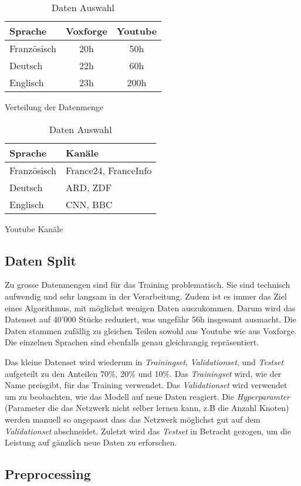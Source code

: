 \begin{table}[h]
    \begin{subtable}[t ]{0.45\textwidth}
        \centering
        \begin{tabular}[t]{l || c c}
        Sprache & Voxforge & Youtube \\
        \hline \hline
        Französisch & 20h & 50h\\
        Deutsch & 22h & 60h\\
        Englisch & 23h & 200h\\
        \end{tabular}
        \caption{Verteilung der Datenmenge}
        \label{tab:amount}
    \end{subtable}
    \hfill
    \begin{subtable}[t ]{0.45\textwidth}
        \centering
        \begin{tabular}[t]{l || l}
        Sprache & Kanäle \\
        \hline \hline
        Französisch & France24, FranceInfo\\
        Deutsch & ARD, ZDF\\
        Englisch & CNN,  BBC
        \end{tabular}
        \caption{Youtube Kanäle}
        \label{tab:channels}
    \end{subtable}
    \caption{Daten Auswahl}
    \label{tab:data}
\end{table}


\subsection{Daten Split}
Zu grosse Datenmengen sind für das Training problematisch. Sie sind technisch aufwendig und sehr langsam in der Verarbeitung. Zudem ist es immer das Ziel eines Algorithmus, mit möglichst wenigen Daten auszukommen. Darum wird das Datenset auf 40'000 Stücke reduziert, was ungefähr 56h insgesamt ausmacht. Die Daten stammen zufällig zu gleichen Teilen sowohl aus Youtube wie aus Voxforge. Die einzelnen Sprachen sind ebenfalls genau gleichrangig repräsentiert.

Das kleine Datenset wird wiederum in \textit{Trainingset}, \textit{Validationset}, und \textit{Testset} aufgeteilt zu den Anteilen 70\%, 20\% und 10\%. Das \textit{Trainingset} wird, wie der Name preisgibt, für das Training verwendet. Das \textit{Validationset} wird verwendet um zu beobachten, wie das Modell auf neue Daten reagiert. Die \textit{Hyperparamter} (Parameter die das Netzwerk nicht selber lernen kann, z.B die Anzahl Knoten) werden manuell so angepasst dass das Netzwerk möglichst gut auf dem \textit{Validationset} abschneidet. Zuletzt wird das \textit{Testset} in Betracht gezogen, um die Leistung auf gänzlich neue Daten zu erforschen.

\subsection{Preprocessing}